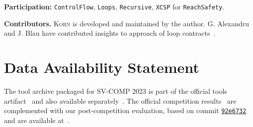 \documentclass{llncs}
\newcommand{\Korn}{\textsc{Korn}\xspace}
\begin{document}
\noindent \textbf{Participation:}
\texttt{ControlFlow},
\texttt{Loops},
\texttt{Recursive},
\texttt{XCSP} for  \texttt{ReachSafety}.

% 
% 
% 
% 
% 
% 
% 
% 
% 
% 
% 

% 

\smallskip

\noindent\textbf{Contributors.}
\Korn is developed and maintained by the author.
G. Alexandru~\cite{alexandru2019} and J. Blau have contributed
insights to approach of loop contracts~\cite{ernst:vmcai2022}.

\section*{Data Availability Statement}

The tool archive packaged for SV-COMP 2023
is part of the official tools artifact~\cite{SVCOMP23-TOOLS-artifact}
and also available separately~\cite{ernst:korn2023}.
The official competition results~\cite{SVCOMP23-RESULTS-artifact}
are complemented with our post-competition evaluation,
based on commit \href{https://github.com/gernst/korn/commit/92e6732645d488a8a7036435f5336d7181c18689}{\tt 92e6732} and are available at~\cite{ernst:korn2023-results}.



\end{document}
